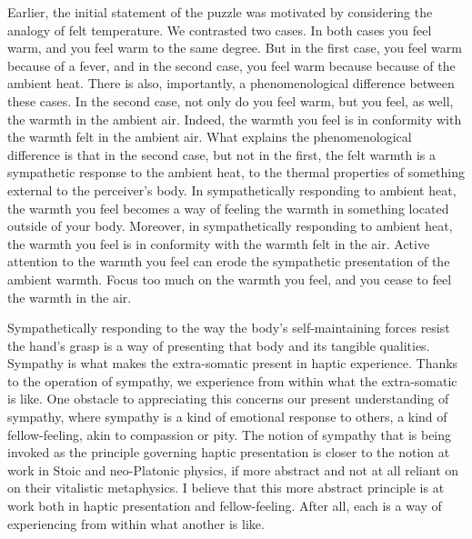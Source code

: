 Earlier, the initial statement of the puzzle was motivated by considering the analogy of felt temperature. We contrasted two cases. In both cases you feel warm, and you feel warm to the same degree. But in the first case, you feel warm because of a fever, and in the second case, you feel warm because because of the ambient heat. There is also, importantly, a phenomenological difference between these cases. In the second case, not only do you feel warm, but you feel, as well, the warmth in the ambient air. Indeed, the warmth you feel is in conformity with the warmth felt in the ambient air. What explains the phenomenological difference is that in the second case, but not in the first, the felt warmth is a sympathetic response to the ambient heat, to the thermal properties of something external to the perceiver's body. In sympathetically responding to ambient heat, the warmth you feel becomes a way of feeling the warmth in something located outside of your body. Moreover, in sympathetically responding to ambient heat, the warmth you feel is in conformity with the warmth felt in the air. Active attention to the warmth you feel can erode the sympathetic presentation of the ambient warmth. Focus too much on the warmth you feel, and you cease to feel the warmth in the air.

Sympathetically responding to the way the body's self-maintaining forces resist the hand's grasp is a way of presenting that body and its tangible qualities. Sympathy is what makes the extra-somatic present in haptic experience. Thanks to the operation of sympathy, we experience from within what the extra-somatic is like. One obstacle to appreciating this concerns our present understanding of sympathy, where sympathy is a kind of emotional response to others, a kind of fellow-feeling, akin to compassion or pity. The notion of sympathy that is being invoked as the principle governing haptic presentation is closer to the notion at work in Stoic and neo-Platonic physics, if more abstract and not at all reliant on on their vitalistic metaphysics. I believe that this more abstract principle is at work both in haptic presentation and fellow-feeling. After all, each is a way of experiencing from within what another is like.

